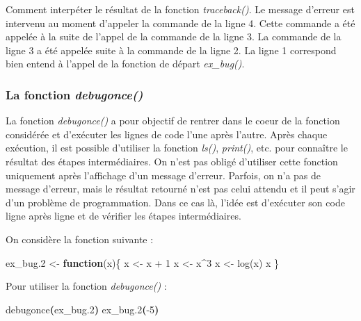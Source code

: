 \documentclass[
]{book}
\newenvironment{Shaded}{\begin{snugshade}}{\end{snugshade}}
\newcommand{\ControlFlowTok}[1]{\textcolor[rgb]{0.13,0.29,0.53}{\textbf{#1}}}
\newcommand{\DecValTok}[1]{\textcolor[rgb]{0.00,0.00,0.81}{#1}}
\newcommand{\ErrorTok}[1]{\textcolor[rgb]{0.64,0.00,0.00}{\textbf{#1}}}
\newcommand{\ExtensionTok}[1]{#1}
\newcommand{\FloatTok}[1]{\textcolor[rgb]{0.00,0.00,0.81}{#1}}
\newcommand{\FunctionTok}[1]{\textcolor[rgb]{0.00,0.00,0.00}{#1}}
\newcommand{\KeywordTok}[1]{\textcolor[rgb]{0.13,0.29,0.53}{\textbf{#1}}}
\newcommand{\NormalTok}[1]{#1}
\newcommand{\OtherTok}[1]{\textcolor[rgb]{0.56,0.35,0.01}{#1}}
\newcommand{\SpecialCharTok}[1]{\textcolor[rgb]{0.00,0.00,0.00}{#1}}
\theoremstyle{definition}
\theoremstyle{definition}
\theoremstyle{definition}
\theoremstyle{definition}
\theoremstyle{remark}
\begin{document}
Comment interpéter le résultat de la fonction \emph{traceback()}. Le message d'erreur est intervenu au moment d'appeler la commande de la ligne 4. Cette commande a été appelée à la suite de l'appel de la commande de la ligne 3. La commande de la ligne 3 a été appelée suite à la commande de la ligne 2. La ligne 1 correspond bien entend à l'appel de la fonction de départ \emph{ex\_bug()}.

\hypertarget{la-fonction-debugonce}{%
\subsubsection{\texorpdfstring{La fonction \emph{debugonce()}}{La fonction debugonce()}}\label{la-fonction-debugonce}}

La fonction \emph{debugonce()} a pour objectif de rentrer dans le coeur de la fonction considérée et d'exécuter les lignes de code l'une après l'autre. Après chaque exécution, il est possible d'utiliser la fonction \emph{ls()}, \emph{print()}, etc. pour connaître le résultat des étapes intermédiaires. On n'est pas obligé d'utiliser cette fonction uniquement après l'affichage d'un message d'erreur. Parfois, on n'a pas de message d'erreur, mais le résultat retourné n'est pas celui attendu et il peut s'agir d'un problème de programmation. Dans ce cas là, l'idée est d'exécuter son code ligne après ligne et de vérifier les étapes intermédiaires.

On considère la fonction suivante :

\begin{Shaded}
\begin{Highlighting}[]
\NormalTok{ex\_bug}\FloatTok{.2} \OtherTok{\textless{}{-}} \ControlFlowTok{function}\NormalTok{(x)\{}
\NormalTok{  x }\OtherTok{\textless{}{-}}\NormalTok{ x }\SpecialCharTok{+} \DecValTok{1}
\NormalTok{  x }\OtherTok{\textless{}{-}}\NormalTok{ x}\SpecialCharTok{\^{}}\DecValTok{3}
\NormalTok{  x }\OtherTok{\textless{}{-}} \FunctionTok{log}\NormalTok{(x)}
\NormalTok{x}
\NormalTok{\}}
\end{Highlighting}
\end{Shaded}

Pour utiliser la fonction \emph{debugonce()} :

\begin{Shaded}
\begin{Highlighting}[]
\ExtensionTok{debugonce}\ErrorTok{(}\ExtensionTok{ex\_bug.2}\KeywordTok{)}
\ExtensionTok{ex\_bug.2}\ErrorTok{(}\ExtensionTok{{-}5}\KeywordTok{)}
\end{Highlighting}
\end{Shaded}
\end{document}
